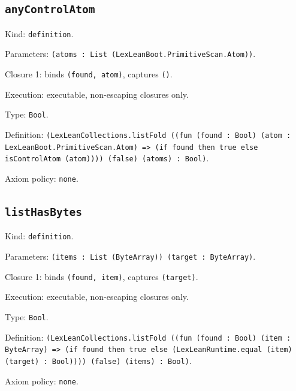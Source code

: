 \documentclass[11pt]{article}
\begin{document}
\subsection*{\texttt{anyControlAtom}}
\noindent Kind: \texttt{definition}.\par
\noindent Parameters: \texttt{(atoms : List (LexLeanBoot.PrimitiveScan.Atom))}.\par
\noindent Closure 1: binds \texttt{(found, atom)}, captures \texttt{()}.\par
\noindent Execution: executable, non-escaping closures only.\par
\noindent Type: \texttt{Bool}.\par
\noindent Definition: \texttt{(LexLeanCollections.listFold ((fun (found : Bool) (atom : LexLeanBoot.PrimitiveScan.Atom) => (if found then true else isControlAtom (atom)))) (false) (atoms) : Bool)}.\par
\noindent Axiom policy: \texttt{none}.\par
\subsection*{\texttt{listHasBytes}}
\noindent Kind: \texttt{definition}.\par
\noindent Parameters: \texttt{(items : List (ByteArray)) (target : ByteArray)}.\par
\noindent Closure 1: binds \texttt{(found, item)}, captures \texttt{(target)}.\par
\noindent Execution: executable, non-escaping closures only.\par
\noindent Type: \texttt{Bool}.\par
\noindent Definition: \texttt{(LexLeanCollections.listFold ((fun (found : Bool) (item : ByteArray) => (if found then true else (LexLeanRuntime.equal (item) (target) : Bool)))) (false) (items) : Bool)}.\par
\noindent Axiom policy: \texttt{none}.\par
\end{document}
